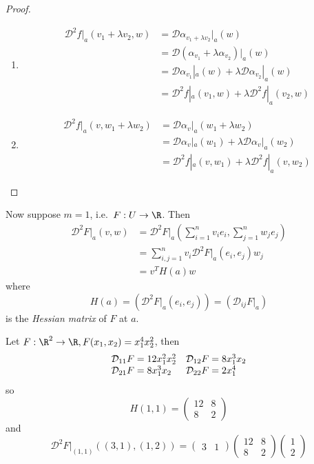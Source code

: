 \documentclass[a4paper]{article}
\newcommand*{\D}{\mathcal{D}}
\theoremstyle{definition}
\begin{document}
\begin{proof}\leavevmode
  \begin{enumerate}
  \item
    \begin{align*}
      \D^2 f|_a(v_1 + \lambda v_2, w) &= \D \alpha_{v_1 + \lambda v_2}|_a (w) \\
                                      &= \D(\alpha_{v_1} + \lambda\alpha_{v_2}) |_a (w) \\
                                      &= \D \alpha_{v_1} |_a (w) + \lambda \D \alpha_{v_2} |_a (w) \\
                                      &= \D^2 f|_a(v_1, w) + \lambda \D^2 f|_a(v_2, w)
    \end{align*}
  \item 
    \begin{align*}
      \D^2 f|_a(v, w_1 + \lambda w_2) &= \D \alpha_v|_a (w_1 + \lambda w_2) \\
                                      &= \D \alpha_v|_a(w_1) + \lambda \D \alpha_v|_a(w_2) \\
                                      &= \D^2 f|_a(v, w_1) + \lambda \D^2 f|_a(v, w_2)
    \end{align*}
  \end{enumerate}
\end{proof}

Now suppose \(m = 1\), i.e.\ \(F: U \to \R\). Then
\begin{align*}
  \D^2 F|_a (v, w) &= \D^2 F|_a \left( \sum_{i = 1}^{n} v_i e_i, \sum_{j = 1}^{n} w_j e_j \right) \\
                   &= \sum_{i, j = 1}^{n} v_i \D^2 F|_a(e_i, e_j) w_j \\
                   &= v^T H(a) w
\end{align*}
where
\[
  H(a) = (\D^2 F|_a (e_i, e_j)) = (\D_{ij} F|_a)
\]
is the \emph{Hessian matrix}  of \(F\) at \(a\).

\begin{eg}
  Let \(F: \R^2 \to \R, F(x_1, x_2) = x_1^4x_2^2\), then
  \[
    \begin{array}[h]{l l}
      \D_{11} F = 12 x_1^2 x_2^2 & \D_{12} F = 8x_1^3 x_2 \\
      \D_{21} F = 8 x_1^3 x_2 & \D_{22} F = 2 x_1^4
    \end{array}
  \]
  so
  \[
    H(1, 1) =
    \begin{pmatrix}
      12 & 8 \\
      8 & 2
    \end{pmatrix}
  \]
  and
  \[
    \D^2 F|_{(1, 1)} ((3, 1), (1, 2)) =
    \begin{pmatrix}
      3 & 1
    \end{pmatrix}
    \begin{pmatrix}
      12 & 8 \\
      8 & 2
    \end{pmatrix}
    \begin{pmatrix}
      1 \\
      2
    \end{pmatrix}
  \]
\end{eg}
\end{document}
